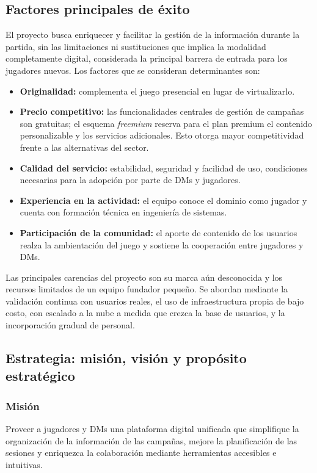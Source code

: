 \subsection{Factores principales de éxito}
El proyecto busca enriquecer y facilitar la gestión de la información durante la partida, sin las limitaciones ni sustituciones que implica la modalidad completamente digital, considerada la principal barrera de entrada para los jugadores nuevos. Los factores que se consideran determinantes son:
\begin{itemize}
  \item \textbf{Originalidad:} complementa el juego presencial en lugar de virtualizarlo.
  \item \textbf{Precio competitivo:} las funcionalidades centrales de gestión de campañas son gratuitas; el esquema \textit{freemium} reserva para el plan premium el contenido personalizable y los servicios adicionales. Esto otorga mayor competitividad frente a las alternativas del sector.
  \item \textbf{Calidad del servicio:} estabilidad, seguridad y facilidad de uso, condiciones necesarias para la adopción por parte de DMs y jugadores.
  \item \textbf{Experiencia en la actividad:} el equipo conoce el dominio como jugador y cuenta con formación técnica en ingeniería de sistemas.
  \item \textbf{Participación de la comunidad:} el aporte de contenido de los usuarios realza la ambientación del juego y sostiene la cooperación entre jugadores y DMs.
\end{itemize}
Las principales carencias del proyecto son su marca aún desconocida y los recursos limitados de un equipo fundador pequeño. Se abordan mediante la validación continua con usuarios reales, el uso de infraestructura propia de bajo costo, con escalado a la nube a medida que crezca la base de usuarios, y la incorporación gradual de personal.

\subsection{Estrategia: misión, visión y propósito estratégico}
\subsubsection{Misión}
Proveer a jugadores y DMs una plataforma digital unificada que simplifique la organización de la información de las campañas, mejore la planificación de las sesiones y enriquezca la colaboración mediante herramientas accesibles e intuitivas.

